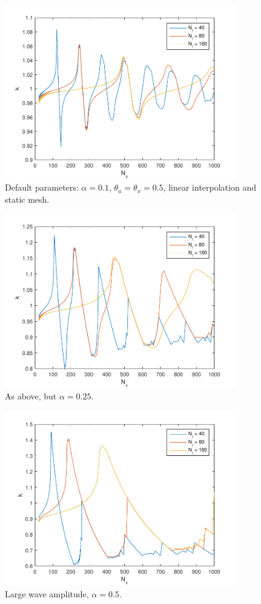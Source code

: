 \documentclass{article}
\begin{document}
\begin{figure}[htbp]
\centering
  \includegraphics[width=0.9\textwidth]{alan0-k.pdf}
  \caption{Default parameters: $\alpha = 0.1$, $\theta_u = \theta_x = 0.5$,
  linear interpolation and static mesh.
  \label{fig:alan0-k}}
\end{figure}
\begin{figure}[hbtp]
\centering
  \includegraphics[width=0.9\textwidth]{alan1-k.pdf}
  \caption{As above, but $\alpha = 0.25$.
  \label{fig:alan1-k}}
\end{figure}
\begin{figure}[htbp]
\centering
  \includegraphics[width=0.9\textwidth]{alan2-k.pdf}
  \caption{Large wave amplitude, $\alpha = 0.5$.
  \label{fig:alan2-k}}
\end{figure}
\end{document}
